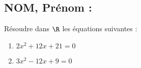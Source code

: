\documentclass[a4paper,11pt,exos]{nsi} %
\begin{document}


\subsection*{NOM, Prénom : \dotfill} 

\maketitle

\begin{exercice}
    Résoudre dans $\R$ les équations suivantes :
    \begin{multicols}{2}
        \begin{enumerate}
            \item $2x^2+12x+21=0$
	        \item $3x^2-12x+9=0$
        \end{enumerate}
    \end{multicols}
    
\end{exercice}

\end{document}
